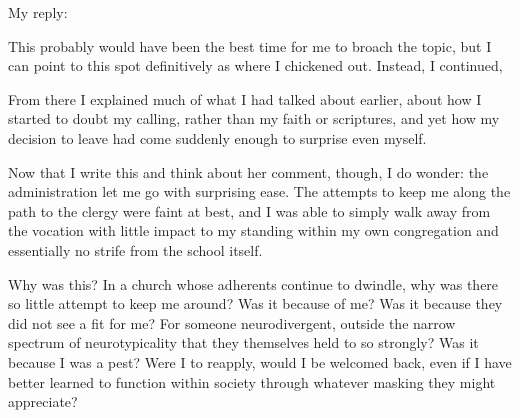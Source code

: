 \vspace{10pt}

My reply:

\vspace{10pt}


\vspace{10pt}

This probably would have been the best time for me to broach the topic, but I can point to this spot definitively as where I chickened out. Instead, I continued,

\vspace{10pt}





\vspace{10pt}

From there I explained much of what I had talked about earlier, about how I started to doubt my calling, rather than my faith or scriptures, and yet how my decision to leave had come suddenly enough to surprise even myself.

Now that I write this and think about her comment, though, I do wonder: the administration let me go with surprising ease. The attempts to keep me along the path to the clergy were faint at best, and I was able to simply walk away from the vocation with little impact to my standing within my own congregation and essentially no strife from the school itself.

Why was this? In a church whose adherents continue to dwindle, why was there so little attempt to keep me around? Was it because of me? Was it because they did not see a fit for me? For someone neurodivergent, outside the narrow spectrum of neurotypicality that they themselves held to so strongly? Was it because I was a pest? Were I to reapply, would I be welcomed back, even if I have better learned to function within society through whatever masking they might appreciate?

